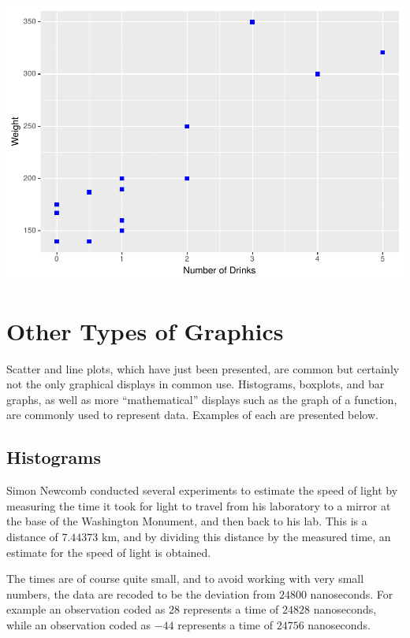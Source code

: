 \documentclass[
]{krantz}
\begin{document}
\includegraphics{bookdown_files/figure-latex/unnamed-chunk-73-1.pdf}

\hypertarget{other-types-of-graphics}{%
\section{Other Types of Graphics}\label{other-types-of-graphics}}

Scatter and line plots, which have just been presented, are common but certainly not the only graphical displays in common use. Histograms, boxplots, and bar graphs, as well as more ``mathematical'' displays such as the graph of a function, are commonly used to represent data. Examples of each are presented below.

\hypertarget{histograms}{%
\subsection{Histograms}\label{histograms}}

Simon Newcomb conducted several experiments to estimate the speed of light by measuring the time it took for light to travel from his laboratory to a mirror at the base of the Washington Monument, and then back to his lab. This is a distance of \(7.44373\) km, and by dividing this distance by the measured time, an estimate for the speed of light is obtained.

The times are of course quite small, and to avoid working with very small numbers, the data are recoded to be the deviation from \(24800\) nanoseconds. For example an observation coded as \(28\) represents a time of \(24828\) nanoseconds, while an observation coded as \(-44\) represents a time of \(24756\) nanoseconds.
\end{document}
